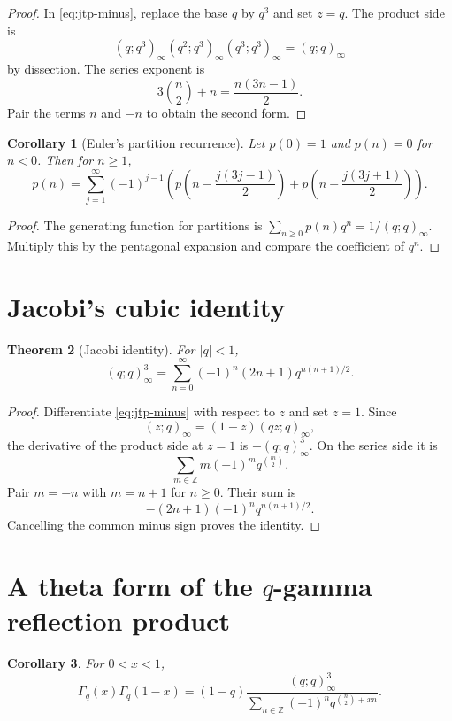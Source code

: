 \documentclass[11pt,oneside,openany]{book}
\newtheorem{theorem}{Theorem}[chapter]
\newtheorem{corollary}[theorem]{Corollary}
\theoremstyle{definition}
\theoremstyle{remark}
\newcommand{\Z}{\mathbb Z}
\newcommand{\abs}[1]{\lvert #1\rvert}
\begin{document}
\begin{proof}
In \eqref{eq:jtp-minus}, replace the base $q$ by $q^3$ and set $z=q$.  The product side is
\[
 (q;q^3)_\infty(q^2;q^3)_\infty(q^3;q^3)_\infty=(q;q)_\infty
\]
by dissection.  The series exponent is
\[
 3\binom n2+n=\frac{n(3n-1)}2.
\]
Pair the terms $n$ and $-n$ to obtain the second form.
\end{proof}

\begin{corollary}[Euler's partition recurrence]\label{cor:euler-partition-recurrence}
Let $p(0)=1$ and $p(n)=0$ for $n<0$.  Then for $n\ge1$,
\[
 p(n)=\sum_{j=1}^{\infty}(-1)^{j-1}
 \left(p\!\left(n-\frac{j(3j-1)}2\right)
 +p\!\left(n-\frac{j(3j+1)}2\right)\right).
\]
\end{corollary}

\begin{proof}
The generating function for partitions is
\(
 \sum_{n\ge0}p(n)q^n=1/(q;q)_\infty.
\)
Multiply this by the pentagonal expansion and compare the coefficient of $q^n$.
\end{proof}

\section{Jacobi's cubic identity}

\begin{theorem}[Jacobi identity]\label{thm:jacobi-cubic}
For $\abs q<1$,
\[
 (q;q)_\infty^3
 =\sum_{n=0}^{\infty}(-1)^n(2n+1)q^{n(n+1)/2}.
\]
\end{theorem}

\begin{proof}
Differentiate \eqref{eq:jtp-minus} with respect to $z$ and set $z=1$.  Since
\[
 (z;q)_\infty=(1-z)(qz;q)_\infty,
\]
the derivative of the product side at $z=1$ is $-(q;q)_\infty^3$.  On the series side it is
\[
 \sum_{m\in\Z}m(-1)^mq^{\binom m2}.
\]
Pair $m=-n$ with $m=n+1$ for $n\ge0$.  Their sum is
\[
 -(2n+1)(-1)^nq^{n(n+1)/2}.
\]
Cancelling the common minus sign proves the identity.
\end{proof}

\section{A theta form of the \texorpdfstring{$q$}{q}-gamma reflection product}

\begin{corollary}\label{cor:qgamma-theta}
For $0<x<1$,
\[
 \Gamma_q(x)\Gamma_q(1-x)
 =(1-q)\frac{(q;q)_\infty^3}
 {\displaystyle\sum_{n\in\Z}(-1)^n
 q^{\binom n2+xn}}.
\]
\end{corollary}
\end{document}
